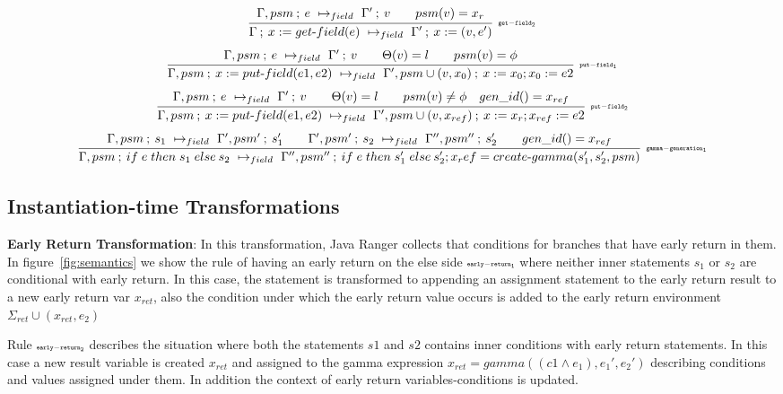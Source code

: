 \begin{figure*}[t]
{{$$$$
$$
\infer[\rn{get-field_2}]
 {\step{\Gamma}{x := get\text{-}field(e)}{\Gamma'}{ x := (v,e')}{field}}
 {\step{\Gamma, psm}{e}{\Gamma'}{v}{field} \qquad psm(v) = x_r}
$$
$$
\infer[\rn{put-field_1}]
 {\step{\Gamma, psm}{x := put\text{-}field(e1, e2)}{\Gamma', psm\cup(v, x_0)}{ x := x_0; x_0 := e2}{field}}
 {\step{\Gamma, psm}{e}{\Gamma'}{v}{field} \qquad \Theta(v) = l \qquad psm(v) = \phi }
$$
$$
\infer[\rn{put-field_2}]
 {\step{\Gamma, psm}{x := put\text{-}field(e1, e2)}{\Gamma', psm\cup(v, x_{ref})}{ x := x_r; x_{ref} := e2}{field}}
 {\step{\Gamma, psm}{e}{\Gamma'}{v}{field} \qquad \Theta(v) = l \qquad psm(v) \neq \phi \quad gen\_id() = x_{ref}}
$$
$$
\infer[\rn{gamma-generation_1}]
 {\step{\Gamma, psm}{\ifr{e}{s_1}{s_2}}{\Gamma'', psm''}{\ifr{e}{s_1'}{s_2'} ; x_ref = create\text{-}gamma(s_1', s_2', psm)}{field}}
 {\step{\Gamma, psm}{s_1}{\Gamma', psm'}{s_1'}{field} \qquad 
 \step{\Gamma', psm'}{s_2}{\Gamma'', psm''}{s_2'}{field}  \qquad gen\_id() = x_{ref}}
$$
}}
\caption{Evaluation Rules for Ranger Transformations}
\label{fig:semantics}
\end{figure*}

\subsection{Instantiation-time Transformations}
\label{sec:instantiationTransformations}

\textbf{Early Return Transformation}: In this transformation, Java Ranger collects that conditions for branches that have early return in them. In figure~\ref{fig:semantics} we show the rule of having an early return on the else side $\scriptscriptstyle\mathtt{early-return_1}$ where neither inner statements $s_1$ or $s_2$ are conditional with early return. In this case, the statement is transformed to appending an assignment statement to the early return result to a new early return var $x_{ret}$, also the condition under which the early return value occurs is added to the early return environment $\Sigma_{ret} \cup (x_{ret}, e_2)$ 

Rule $\scriptscriptstyle\mathtt{early-return_2}$ describes the situation where both the statements $s1$ and $s2$ contains inner conditions with early return statements. In this case a new result variable is created $x_{ret}$ and assigned to the gamma expression $x_{ret} = gamma((c1 \wedge e_1), e_1',  e_2')$ describing conditions and values assigned under them. In addition the context of early return variables-conditions is updated. 


